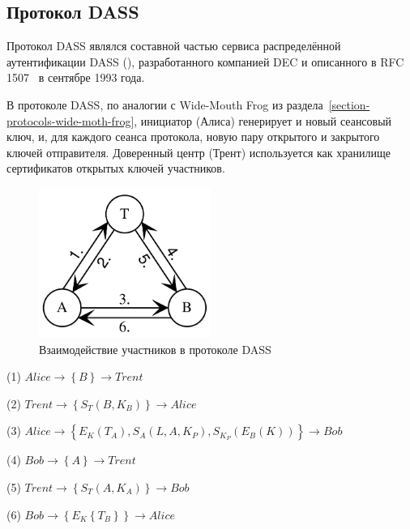 \subsection{Протокол DASS}

Протокол DASS являлся составной частью сервиса распределённой аутентификации DASS (), разработанного компанией DEC и описанного в RFC 1507~\cite{rfc1507} в сентябре 1993 года.

В протоколе DASS, по аналогии с Wide-Mouth Frog из раздела~\ref{section-protocols-wide-moth-frog}, инициатор (Алиса) генерирует и новый сеансовый ключ, и, для каждого сеанса протокола, новую пару открытого и закрытого ключей отправителя. Доверенный центр (Трент) используется как хранилище сертификатов открытых ключей участников.

\begin{figure}
    \centering
    \includegraphics[width=0.5\textwidth]{pic/key_distribution-dass}
    \caption{Взаимодействие участников в протоколе DASS\label{fig:key_distribution-dass}}
\end{figure}

\begin{protocol}
    \item[(1)] $Alice \to \left\{ B \right\} \to Trent$
    \item[(2)] $Trent \to \left\{ S_T \left( B, K_B \right) \right\} \to Alice$
    \item[(3)] $Alice \to \left\{ E_K \left( T_A \right), S_A \left( L, A, K_P \right), S_{K_P} \left( E_B \left( K \right) \right) \right\} \to Bob$
    \item[(4)] $Bob \to \left\{ A \right\} \to Trent$
    \item[(5)] $Trent \to \left\{ S_T \left( A, K_A \right) \right\} \to Bob$
    \item[(6)] $Bob \to \left\{ E_K \left\{ T_B \right\} \right\} \to Alice$
\end{protocol}

